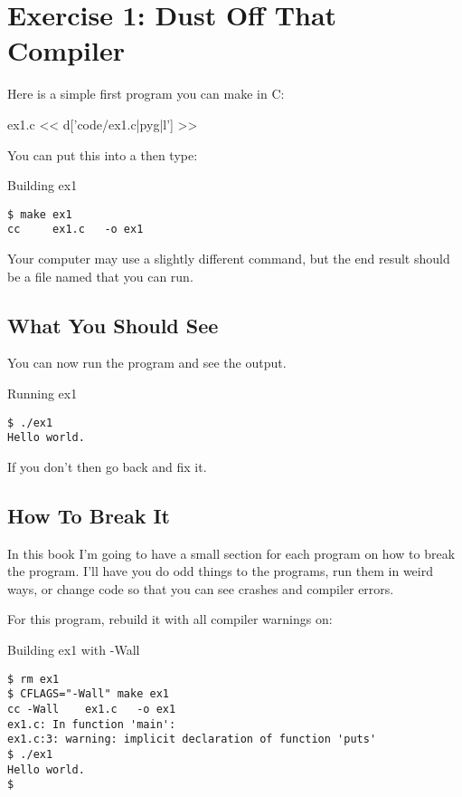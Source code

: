 \chapter{Exercise 1: Dust Off That Compiler}

Here is a simple first program you can make in C:

\begin{code}{ex1.c}
<< d['code/ex1.c|pyg|l'] >>
\end{code}

You can put this into a  then type:

\begin{Terminal}{Building ex1}
\begin{lstlisting}
$ make ex1
cc     ex1.c   -o ex1
\end{lstlisting}
\end{Terminal}

Your computer may use a slightly different command, but the end result should be
a file named  that you can run.

\section{What You Should See}

You can now run the program and see the output.

\begin{Terminal}{Running ex1}
\begin{lstlisting}
$ ./ex1
Hello world.
\end{lstlisting}
\end{Terminal}

If you don't then go back and fix it.
    
\section{How To Break It}

In this book I'm going to have a small section for each program on how to
break the program.  I'll have you do odd things to the programs, run them
in weird ways, or change code so that you can see crashes and compiler errors.

For this program, rebuild it with all compiler warnings on:

\begin{Terminal}{Building ex1 with -Wall}
\begin{lstlisting}
$ rm ex1
$ CFLAGS="-Wall" make ex1
cc -Wall    ex1.c   -o ex1
ex1.c: In function 'main':
ex1.c:3: warning: implicit declaration of function 'puts'
$ ./ex1
Hello world.
$ 
\end{lstlisting}
\end{Terminal}

